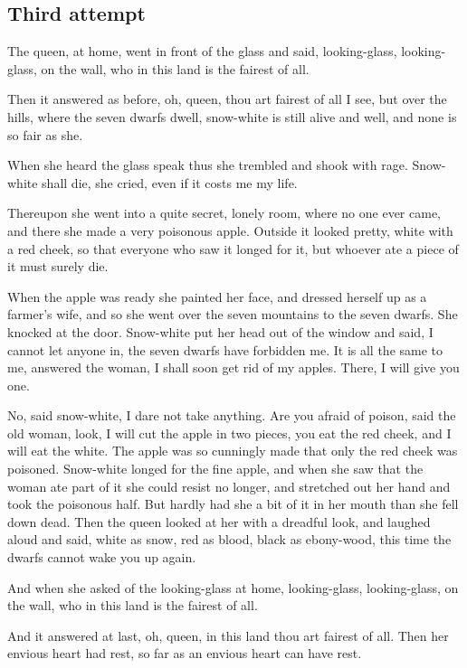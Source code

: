 \documentclass[a4paper,11pt]{article}
\begin{document}
\subsection{Third attempt}

The queen, at home, went in front of the glass and said,
          looking-glass, looking-glass, on the wall,
          who in this land is the fairest of all.

Then it answered as before,
          oh, queen, thou art fairest of all I see,
          but over the hills, where the seven dwarfs dwell,
          snow-white is still alive and well,
          and none is so fair as she.

When she heard the glass speak thus she trembled and shook
with rage.  Snow-white shall die, she cried, even if it costs me
my life.

Thereupon she went into a quite secret, lonely room, where no
one ever came, and there she made a very poisonous apple.
Outside it looked pretty, white with a red cheek, so that
everyone who saw it longed for it, but whoever ate a piece of it
must surely die.

When the apple was ready she painted her face, and dressed herself
up as a farmer's wife, and so she went over the seven
mountains to the seven dwarfs.  She knocked at the door.  Snow-white
put her head out of the window and said, I cannot let
anyone in, the seven dwarfs have forbidden me.  It is all the
same to me, answered the woman, I shall soon get rid of my apples.
There, I will give you one.

No, said snow-white, I dare not take anything.  Are you afraid
of poison, said the old woman, look, I will cut the apple in two
pieces, you eat the red cheek, and I will eat the white.  The
apple was so cunningly made that only the red cheek was
poisoned.  Snow-white longed for the fine apple, and when she saw
that the woman ate part of it she could resist no longer, and
stretched out
her hand and took the poisonous half.  But hardly had she a bit
of it in her mouth than she fell down dead.  Then the queen
looked at her with a dreadful look, and laughed aloud and said,
white as snow, red as blood, black as ebony-wood, this time the
dwarfs cannot wake you up again.

And when she asked of the looking-glass at home,
          looking-glass, looking-glass, on the wall,
          who in this land is the fairest of all.

And it answered at last,
          oh, queen, in this land thou art fairest of all.
Then her envious heart had rest, so far as an envious heart can
have rest.
\end{document}
